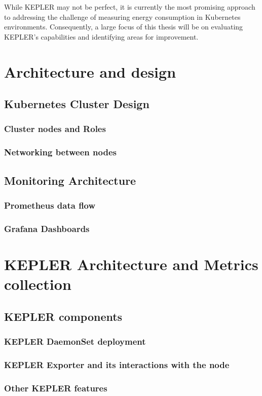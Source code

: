 While KEPLER may not be perfect, it is currently the most promising approach to addressing the challenge of measuring energy consumption in Kubernetes environments. Consequently, a large focus of this thesis will be on evaluating KEPLER's capabilities and identifying areas for improvement.


\section{Architecture and design}
\subsection{Kubernetes Cluster Design}
\subsubsection{Cluster nodes and Roles}
\subsubsection{Networking between nodes}
\subsection{Monitoring Architecture}
\subsubsection{Prometheus data flow}
\subsubsection{Grafana Dashboards}

\section{KEPLER Architecture and Metrics collection}
\subsection{KEPLER components}
\subsubsection{KEPLER DaemonSet deployment}
\subsubsection{KEPLER Exporter and its interactions with the node}
\subsubsection{Other KEPLER features}

